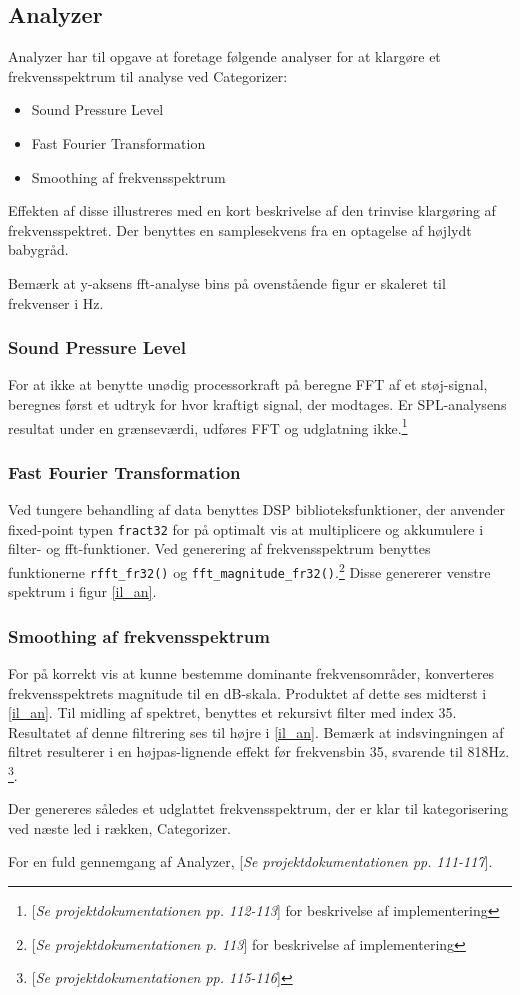 \subsection{Analyzer}
Analyzer har til opgave at foretage følgende analyser for at klargøre et frekvensspektrum til analyse ved Categorizer:
\begin{itemize}
	\item Sound Pressure Level
	\item Fast Fourier Transformation
	\item Smoothing af frekvensspektrum
\end{itemize}

Effekten af disse illustreres med en kort beskrivelse af den trinvise klargøring af frekvensspektret. Der benyttes en samplesekvens fra en optagelse af højlydt babygråd.

Bemærk at y-aksens fft-analyse bins på ovenstående figur er skaleret til frekvenser i Hz.

\subsubsection*{Sound Pressure Level}
For at ikke at benytte unødig processorkraft på beregne FFT af et støj-signal, beregnes først et udtryk for hvor kraftigt signal, der modtages. Er SPL-analysens resultat under en grænseværdi, udføres FFT og udglatning ikke.\footnote{[\textit{Se projektdokumentationen pp. 112-113}] for beskrivelse af implementering}

\subsubsection*{Fast Fourier Transformation}
Ved tungere behandling af data benyttes DSP biblioteksfunktioner, der anvender fixed-point typen \verb+fract32+ for på optimalt vis at multiplicere og akkumulere i filter- og fft-funktioner. Ved generering af frekvensspektrum benyttes funktionerne \verb+rfft_fr32()+ og \verb+fft_magnitude_fr32()+.\footnote{[\textit{Se projektdokumentationen p. 113}] for beskrivelse af implementering} Disse genererer venstre spektrum i figur \ref{il_an}.

\subsubsection*{Smoothing af frekvensspektrum}
For på korrekt vis at kunne bestemme dominante frekvensområder, konverteres frekvensspektrets magnitude til en dB-skala. Produktet af dette ses midterst i \ref{il_an}.
Til midling af spektret, benyttes et rekursivt filter med index 35. Resultatet af denne filtrering ses til højre i \ref{il_an}. Bemærk at indsvingningen af filtret resulterer i en højpas-lignende effekt før frekvensbin 35, svarende til 818Hz. \footnote{[\textit{Se projektdokumentationen pp. 115-116}]}. 

Der genereres således et udglattet frekvensspektrum, der er klar til kategorisering ved næste led i rækken, Categorizer.

For en fuld gennemgang af Analyzer, [\textit{Se projektdokumentationen pp. 111-117}].